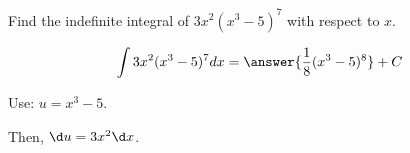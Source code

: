 \documentclass{ximera}
\author{Gregory Hartman \and Matthew Carr\and Nela Lakos}
\begin{document}
\begin{exercise}

Find the indefinite integral of $3x^2(x^3-5)^7$ with respect to $x$.

\[
\int 3x^2(x^3-5)^7 dx=\answer{\frac{1}{8}(x^3-5)^8}+C
\]

\begin{hint}
Use: $u=x^3-5$.
\end{hint}
\begin{hint}
Then,  $\d u=3x^2 \d x$.
\end{hint}
\end{exercise}
\end{document}
